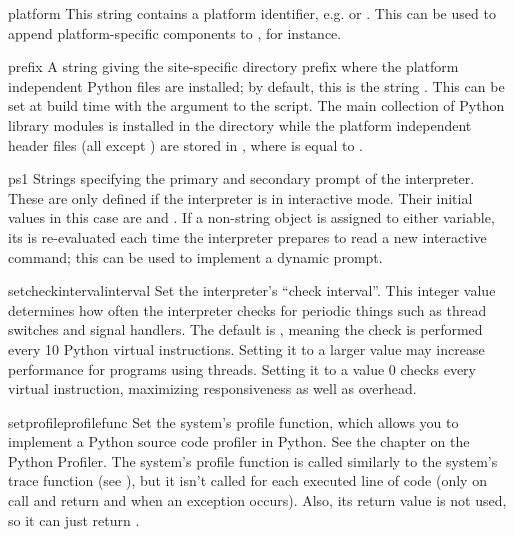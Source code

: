 \begin{datadesc}{platform}
This string contains a platform identifier, e.g.  or
.  This can be used to append platform-specific
components to , for instance. 
\end{datadesc}

\begin{datadesc}{prefix}
A string giving the site-specific directory prefix where the platform
independent Python files are installed; by default, this is the string
.  This can be set at build time with the
\programopt{-} argument to the
 script.  The main collection of Python library
modules is installed in the directory  while the platform independent header
files (all except ) are stored in , where  is equal to
.
\end{datadesc}

\begin{datadesc}{ps1}
  Strings specifying the primary and secondary prompt of the
  interpreter.  These are only defined if the interpreter is in
  interactive mode.  Their initial values in this case are
   and .  If a non-string object is assigned
  to either variable, its  is re-evaluated each time
  the interpreter prepares to read a new interactive command; this can
  be used to implement a dynamic prompt.
\end{datadesc}

\begin{funcdesc}{setcheckinterval}{interval}
Set the interpreter's ``check interval''.  This integer value
determines how often the interpreter checks for periodic things such
as thread switches and signal handlers.  The default is , meaning
the check is performed every 10 Python virtual instructions.  Setting
it to a larger value may increase performance for programs using
threads.  Setting it to a value \code{<=} 0 checks every virtual instruction,
maximizing responsiveness as well as overhead.
\end{funcdesc}

\begin{funcdesc}{setprofile}{profilefunc}
  Set the system's profile function, which allows you to implement a
  Python source code profiler in Python.  See the chapter on the
  Python Profiler.  The system's profile function
  is called similarly to the system's trace function (see
  ), but it isn't called for each executed line of
  code (only on call and return and when an exception occurs).  Also,
  its return value is not used, so it can just return .
\end{funcdesc}

